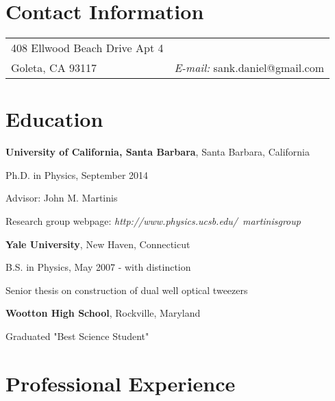 \documentclass[margin=2cm,line]{res}
\newenvironment{list3}{
  \begin{list}{}{%
      \setlength{\itemsep}{0in}
      \setlength{\parsep}{0in} \setlength{\parskip}{0in}
      \setlength{\topsep}{0in} \setlength{\partopsep}{0in}
      \setlength{\leftmargin}{0.2in}}}{\end{list}}
\begin{document}

\begin{resume}


\section{\sc Contact Information}
\vspace{.05in}
\begin{tabular}{@{}p{2in}p{4in}}
408 Ellwood Beach Drive Apt 4 \\
Goleta, CA 93117 & {\it E-mail:}  sank.daniel@gmail.com\\

\end{tabular}


\section{\sc Education}
{\bf University of California, Santa Barbara}, Santa Barbara, California\\
\vspace*{-.15in}
\begin{list3}
\item Ph.D. in Physics, September 2014
\item Advisor: John M. Martinis
\item Research group webpage: \textit{http://www.physics.ucsb.edu/~martinisgroup}
\end{list3}

{\bf Yale University}, New Haven, Connecticut\\
\vspace*{-.15in}
\begin{list3}
\item B.S. in Physics, May 2007 - with distinction
\item Senior thesis on construction of dual well optical tweezers
\end{list3}

{\bf Wootton High School}, Rockville, Maryland\\
\vspace*{-.15in}
\begin{list3}
\item Graduated "Best Science Student"
\end{list3}


\section{\sc Professional Experience}


\end{resume}
\end{document}
